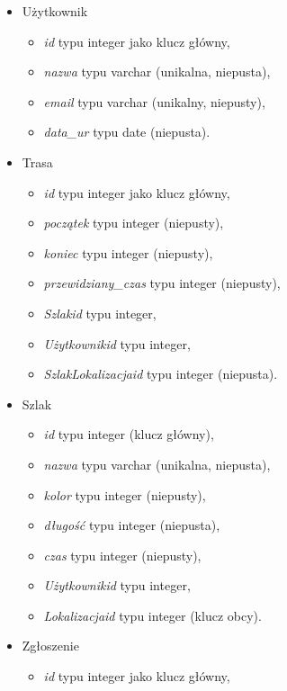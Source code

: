     \begin{itemize}
        \item []Użytkownik
        \begin{itemize}
            \item \textit{id} typu integer jako klucz główny,
            \item \textit{nazwa} typu varchar (unikalna, niepusta),
            \item \textit{email} typu varchar (unikalny, niepusty),
            \item \textit{data\_ur} typu date (niepusta).
        \end{itemize}
        \item []Trasa
        \begin{itemize}
            \item \textit{id} typu integer jako klucz główny,
            \item \textit{początek} typu integer (niepusty),
            \item \textit{koniec} typu integer (niepusty),
            \item \textit{przewidziany\_czas} typu integer (niepusty),
            \item \textit{Szlakid} typu integer,
            \item \textit{Użytkownikid} typu integer,
            \item \textit{SzlakLokalizacjaid} typu integer (niepusta).
        \end{itemize}
        \item []Szlak
        \begin{itemize}
            \item \textit{id} typu integer (klucz główny),
            \item \textit{nazwa} typu varchar (unikalna, niepusta),
            \item \textit{kolor} typu integer (niepusty),
            \item \textit{długość} typu integer (niepusta),
            \item \textit{czas} typu integer (niepusty),
            \item \textit{Użytkownikid} typu integer,
            \item \textit{Lokalizacjaid} typu integer (klucz obcy).
        \end{itemize}
        \item []Zgłoszenie
        \begin{itemize}
            \item \textit{id} typu integer jako klucz główny,

\end{itemize}
\end{itemize}
